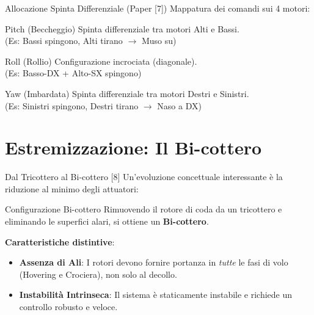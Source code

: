 \documentclass[aspectratio=169]{beamer}
\begin{document}
\begin{frame}{Allocazione Spinta Differenziale (Paper [7])}
    Mappatura dei comandi sui 4 motori:
    \vspace{0.1cm} %

    \begin{block}{Pitch (Beccheggio)}
        Spinta differenziale tra motori Alti e Bassi. \\
        {\footnotesize (Es: Bassi spingono, Alti tirano $\to$ Muso su)}
    \end{block}
    
    \vspace{0.1cm}

    \begin{block}{Roll (Rollio)}
        Configurazione incrociata (diagonale). \\
        {\footnotesize (Es: Basso-DX + Alto-SX spingono)}
    \end{block}

    \vspace{0.1cm}

    \begin{block}{Yaw (Imbardata)}
        Spinta differenziale tra motori Destri e Sinistri. \\
        {\footnotesize (Es: Sinistri spingono, Destri tirano $\to$ Naso a DX)}
    \end{block}
\end{frame}

\section{Estremizzazione: Il Bi-cottero}

\begin{frame}{Dal Tricottero al Bi-cottero [8]}
    Un'evoluzione concettuale interessante è la riduzione al minimo degli attuatori:
    \begin{alertblock}{Configurazione Bi-cottero}
        Rimuovendo il rotore di coda da un tricottero e eliminando le superfici alari, si ottiene un \textbf{Bi-cottero}.
    \end{alertblock}
    \vspace{0.2cm}
    \textbf{Caratteristiche distintive}:
    \begin{itemize}
        \item \textbf{Assenza di Ali}: I rotori devono fornire portanza in \textit{tutte} le fasi di volo (Hovering e Crociera), non solo al decollo.
        \item \textbf{Instabilità Intrinseca}: Il sistema è staticamente instabile e richiede un controllo robusto e veloce.
    \end{itemize}
\end{frame}
\end{document}
